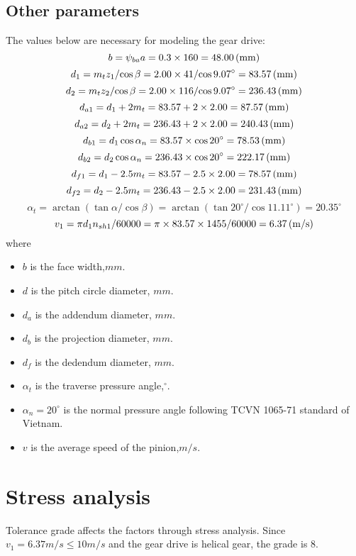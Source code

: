 \subsection{Other parameters}
The values below are necessary for modeling the gear drive:\\
\[ b = \psi_{ba}a = 0.3\times 160= 48.00\, (\mathrm{mm})\]
\[ d_1 = {m_tz_1}/{\cos\beta} = {2.00\times 41}/{\cos9.07^\circ} = 83.57\, (\mathrm{mm})\]
\[ d_2 = {m_tz_2}/{\cos\beta} = {2.00\times 116}/{\cos9.07^\circ} = 236.43\, (\mathrm{mm})\]
\[ d_{a1} = d_1 + 2m_t = 83.57 + 2\times 2.00 = 87.57\, (\mathrm{mm})\]
\[ d_{a2} = d_2 + 2m_t = 236.43 + 2\times 2.00 = 240.43\, (\mathrm{mm})\]
\[ d_{b1} = d_1\cos\alpha_n = 83.57\times \cos 20^\circ = 78.53\, (\mathrm{mm})\]
\[ d_{b2} = d_2\cos\alpha_n = 236.43\times \cos 20^\circ = 222.17 \, (\mathrm{mm})\]
\[ d_{f1} = d_1 - 2.5m_t = 83.57 - 2.5\times 2.00 = 78.57\, (\mathrm{mm})\]
\[ d_{f2} = d_2 - 2.5m_t = 236.43 - 2.5\times 2.00 = 231.43\, (\mathrm{mm})\]
\[ \alpha_t = \arctan\left({\tan\alpha}/{\cos\beta}\right) = \arctan\left({\tan 20^\circ}/{\cos 11.11^\circ}\right) = 20.35^\circ\]
\[ v_1 = {\pi d_1n_{sh1}}/{60000} = {\pi \times 83.57 \times 1455}/{60000} = 6.37\, (\mathrm{m/s})\]
where
\begin{itemize}
	\item $ b $ is the face width,$ \unit{mm} $.
	\item $ d $ is the pitch circle diameter, $ \unit{mm} $.
	\item $ d_a $ is the addendum diameter, $ \unit{mm} $.
	\item $ d_b $ is the projection diameter, $ \unit{mm} $.
	\item $ d_f $ is the dedendum diameter, $ \unit{mm} $.
	\item $ \alpha_t $ is the traverse pressure angle,$ ^\circ $.
	\item $ \alpha_n=20^\circ $ is the normal pressure angle following TCVN 1065-71 standard of Vietnam.
	\item $ v $ is the average speed of the pinion,$ \unit{m/s} $.
\end{itemize}

\section{Stress analysis}
Tolerance grade affects the factors through stress analysis. Since $ v_1=6.37 \unit{m/s} \leq 10 \unit{m/s} $ and the gear drive is helical gear, the grade is 8.

